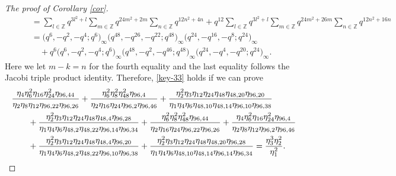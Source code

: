 \documentclass[pdftex]{sigma}
\numberwithin{equation}{section}
\theoremstyle{definition}
\begin{document}
\begin{proof}[The proof of Corollary \ref{cor}]
\begin{align*}
& \qquad =\sum_{l\in\mathbb{Z}}q^{3l^2+l}\sum_{m\in\mathbb{Z}}q^{24m^2+2m}\sum_{n\in\mathbb{Z}}q^{12n^2+4n}+q^{12}\sum_{l\in\mathbb{Z}}q^{3l^2+l}\sum_{m\in\mathbb{Z}}q^{24m^2+26m}\sum_{n\in\mathbb{Z}}q^{12n^2+16n}\\
& \qquad =\bigl(q^6,-q^2,-q^4;q^6\bigr)_{\infty} \bigl(q^{48},-q^{26},-q^{22};q^{48}\bigr)_{\infty}\bigl(q^{24},-q^{16},-q^8;q^{24}\bigr)_{\infty}\\
&\qquad\quad{} +q^6\bigl(q^6,-q^2,-q^4;q^6\bigr)_{\infty} \bigl(q^{48},-q^2,-q^{46};q^{48}\bigr)_{\infty}\bigl(q^{24},-q^4,-q^{20};q^{24}\bigr)_{\infty}.
\end{align*}
Here we let $m-k=n$ for the fourth equality and the last equality follows the Jacobi triple product identity. Therefore, \eqref{key-33} holds if we can prove
\begin{align}\notag
&\frac{\eta_4\eta^2_6\eta_{16}\eta^2_{24}\eta_{96,44}}{\eta_2\eta_8\eta_{12}\eta_{96,22}\eta_{96,26}}+\frac{\eta^2_6\eta^2_8\eta^2_{48}\eta_{96,4}}{\eta_2\eta_{16}\eta_{24}\eta_{96,2}\eta_{96,46}}+\frac{\eta^2_2
\eta_3\eta_{12}\eta_{24}\eta_{48}\eta_{48,20}\eta_{96,20}}{\eta_1\eta_4\eta_6\eta_{48,10}\eta_{48,14}\eta_{96,10}\eta_{96,38}}\\
&\qquad{} +\frac{\eta^2_2\eta_3\eta_{12}\eta_{24}\eta_{48}\eta_{48,4}\eta_{96,28}}{\eta_1\eta_4\eta_6\eta_{48,2}\eta_{48,22}\eta_{96,14}\eta_{96,34}}+\frac{\eta^2_6\eta^2_8\eta^2_{48}\eta_{96,44}}{\eta_2\eta_{16}\eta_{24}\eta_{96,22}\eta_{96,26}}+
\frac{\eta_4\eta^2_6\eta_{16}\eta^2_{24}\eta_{96,4}}{\eta_2\eta_8\eta_{12}\eta_{96,2}\eta_{96,46}}\notag\\
&\qquad{} +\frac{\eta^2_2\eta_3\eta_{12}\eta_{24}\eta_{48}\eta_{48,4}\eta_{96,20}}
{\eta_1\eta_4\eta_6\eta_{48,2}\eta_{48,22}\eta_{96,10}\eta_{96,38}} +\frac{\eta^2_2\eta_3\eta_{12}\eta_{24}\eta_{48}\eta_{48,20}\eta_{96,28}} {\eta_1\eta_4\eta_6\eta_{48,10}\eta_{48,14}\eta_{96,14}\eta_{96,34}}=\frac{\eta^3_3\eta^2_2}{\eta^2_1}.\label{key-id2}
\end{align}


\end{proof}
\end{document}
